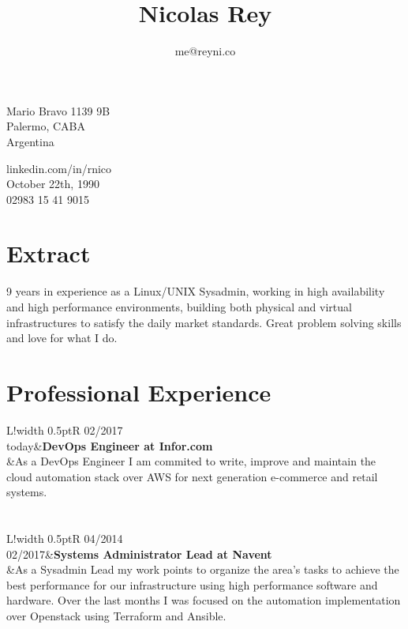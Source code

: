 \documentclass[10pt]{article}
\title{\bfseries\Huge Nicolas Rey}
\author{me@reyni.co}
\date{}
\newcommand\VRule{\color{lightgray}\vrule width 0.5pt}
\begin{document}
\maketitle
\vspace{1em}
\begin{minipage}[ht]{0.48\textwidth}
Mario Bravo 1139 9B\\
Palermo, CABA\\
Argentina
\end{minipage}
\begin{minipage}[ht]{0.48\textwidth}
linkedin.com/in/rnico\\
October 22th, 1990\\
02983 15 41 9015
\end{minipage}
\vspace{20pt}
 
\section*{Extract}
9 years in experience as a Linux/UNIX Sysadmin, working in high availability and high performance environments, building both physical and virtual infrastructures to satisfy the daily market standards. Great problem solving skills and love for what I do. 
 
\section*{Professional Experience}
\begin{tabular}{L!{\VRule}R}
02/2017\\today&{\bf DevOps Engineer at Infor.com}\\
&As a DevOps Engineer I am commited to write, improve and maintain the cloud automation stack over AWS for next generation e-commerce and retail systems.\\
\end{tabular}
\section*{}
\begin{tabular}{L!{\VRule}R}
04/2014\\02/2017&{\bf Systems Administrator Lead at Navent}\\
&As a Sysadmin Lead my work points to organize the area's tasks to achieve the best performance for our infrastructure using high performance software and hardware. Over the last months I was focused on the automation implementation over Openstack using Terraform and Ansible.\\
\end{tabular}
\end{document}
